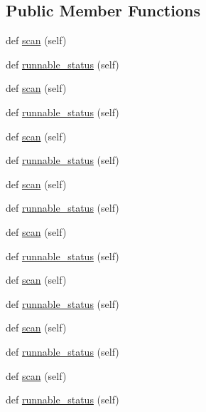 \subsection*{Public Member Functions}
\begin{DoxyCompactItemize}
\item 
def \hyperlink{classwaflib_1_1_tools_1_1fc_1_1fc_a6d914d7b3fbabb00177614858b7a2228}{scan} (self)
\item 
def \hyperlink{classwaflib_1_1_tools_1_1fc_1_1fc_aeef17ac252180b84177f3ba9a323a9f8}{runnable\+\_\+status} (self)
\item 
def \hyperlink{classwaflib_1_1_tools_1_1fc_1_1fc_a6d914d7b3fbabb00177614858b7a2228}{scan} (self)
\item 
def \hyperlink{classwaflib_1_1_tools_1_1fc_1_1fc_aeef17ac252180b84177f3ba9a323a9f8}{runnable\+\_\+status} (self)
\item 
def \hyperlink{classwaflib_1_1_tools_1_1fc_1_1fc_a6d914d7b3fbabb00177614858b7a2228}{scan} (self)
\item 
def \hyperlink{classwaflib_1_1_tools_1_1fc_1_1fc_aeef17ac252180b84177f3ba9a323a9f8}{runnable\+\_\+status} (self)
\item 
def \hyperlink{classwaflib_1_1_tools_1_1fc_1_1fc_a6d914d7b3fbabb00177614858b7a2228}{scan} (self)
\item 
def \hyperlink{classwaflib_1_1_tools_1_1fc_1_1fc_aeef17ac252180b84177f3ba9a323a9f8}{runnable\+\_\+status} (self)
\item 
def \hyperlink{classwaflib_1_1_tools_1_1fc_1_1fc_a6d914d7b3fbabb00177614858b7a2228}{scan} (self)
\item 
def \hyperlink{classwaflib_1_1_tools_1_1fc_1_1fc_aeef17ac252180b84177f3ba9a323a9f8}{runnable\+\_\+status} (self)
\item 
def \hyperlink{classwaflib_1_1_tools_1_1fc_1_1fc_a6d914d7b3fbabb00177614858b7a2228}{scan} (self)
\item 
def \hyperlink{classwaflib_1_1_tools_1_1fc_1_1fc_aeef17ac252180b84177f3ba9a323a9f8}{runnable\+\_\+status} (self)
\item 
def \hyperlink{classwaflib_1_1_tools_1_1fc_1_1fc_a6d914d7b3fbabb00177614858b7a2228}{scan} (self)
\item 
def \hyperlink{classwaflib_1_1_tools_1_1fc_1_1fc_aeef17ac252180b84177f3ba9a323a9f8}{runnable\+\_\+status} (self)
\item 
def \hyperlink{classwaflib_1_1_tools_1_1fc_1_1fc_a6d914d7b3fbabb00177614858b7a2228}{scan} (self)
\item 
def \hyperlink{classwaflib_1_1_tools_1_1fc_1_1fc_aeef17ac252180b84177f3ba9a323a9f8}{runnable\+\_\+status} (self)

\end{DoxyCompactItemize}
